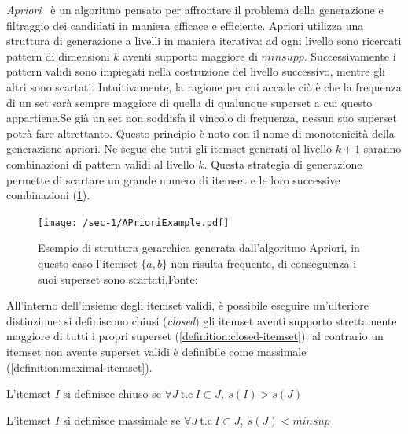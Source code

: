 \textit{Apriori}~\cite{agarwal2001tree} è un algoritmo pensato per affrontare il problema della generazione
e filtraggio dei candidati in maniera efficace e efficiente.
Apriori utilizza una struttura di generazione a livelli in maniera iterativa: ad ogni livello sono ricercati pattern di dimensioni \(k\)
aventi supporto maggiore di \(minsupp\).
Successivamente i pattern validi sono impiegati nella costruzione
del livello successivo, mentre gli altri sono scartati.
Intuitivamente, la ragione per cui accade ciò è che la frequenza di un set sarà sempre maggiore di
quella di qualunque superset a cui questo appartiene.Se già un set non soddisfa il vincolo di frequenza,
nessun suo superset potrà fare altrettanto.
Questo principio è noto con il nome di monotonicità della generazione apriori.
Ne segue che tutti gli itemset generati al livello \(k + 1\) saranno combinazioni di pattern validi al livello
\(k\).
Questa strategia di generazione permette di scartare un grande numero di itemset e le loro successive
combinazioni (\cref{fig:chap-1:apriori-example}).

\begin{figure}
\centering
  \texttt{[image: /sec-1/APrioriExample.pdf]}
  \caption{Esempio di struttura gerarchica generata dall'algoritmo Apriori, in questo caso l'itemset \( \{ a,b \} \) non risulta frequente, di conseguenza i suoi superset sono scartati,Fonte:~\cite{biascsru72:online}}%
  \label{fig:chap-1:apriori-example}
\end{figure}

All'interno dell'insieme degli itemset validi, è possibile eseguire un'ulteriore distinzione:
si definiscono chiusi (\textit{closed}) gli itemset aventi supporto strettamente maggiore di
tutti i propri superset (\cref{definition:closed-itemset}); al contrario un itemset non avente superset validi è definibile come
massimale (\cref{definition:maximal-itemset}).

\begin{definition}\label{definition:closed-itemset}
L'itemset \(I\) si definisce chiuso se \( \forall J~\text{t.c}~ I \subset J,~ s(I) > s(J)\)
\end{definition}

\begin{definition}\label{definition:maximal-itemset}
L'itemset \(I\) si definisce massimale se \( \forall J~\text{t.c}~ I \subset J,~s(J) < minsup\)
\end{definition}

